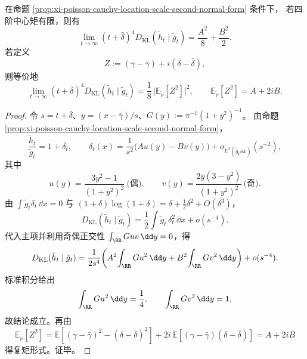 \begin{theorem}[二阶熵系数的锐极限与复二阶矩分解]\label{thm:xi-poisson-cauchy-location-scale-kl-sharp-m2}
在命题 \ref{prop:xi-poisson-cauchy-location-scale-second-normal-form} 条件下，
若四阶中心矩有限，则有
\[
\lim_{t\to\infty}(t+\bar\delta)^4 D_{\mathrm{KL}}(\tilde h_t\mid \tilde g_t)
=\frac{A^2}{8}+\frac{B^2}{2}.
\]
若定义
\[
Z:=(\gamma-\bar\gamma)+i(\delta-\bar\delta),
\]
则等价地
\[
\lim_{t\to\infty}(t+\bar\delta)^4 D_{\mathrm{KL}}(\tilde h_t\mid \tilde g_t)
=\frac18\,\bigl|\mathbb E_{\tilde\nu}[Z^2]\bigr|^2,
\qquad
\mathbb E_{\tilde\nu}[Z^2]=A+2iB.
\]
\end{theorem}

\begin{proof}
令 \(s=t+\bar\delta\)、\(y=(x-\bar\gamma)/s\)、\(G(y):=\pi^{-1}(1+y^2)^{-1}\)。
由命题 \ref{prop:xi-poisson-cauchy-location-scale-second-normal-form}，
\[
\frac{\tilde h_t}{\tilde g_t}=1+\delta_t,\qquad
\delta_t(x)=\frac{1}{s^2}\bigl(Au(y)-Bv(y)\bigr)+o_{L^2(\tilde g_t\dd x)}(s^{-2}),
\]
其中
\[
u(y)=\frac{3y^2-1}{(1+y^2)^2}\ \text{(偶)},\qquad
v(y)=\frac{2y(3-y^2)}{(1+y^2)^2}\ \text{(奇)}.
\]
由 \(\int \tilde g_t\delta_t\,\dd x=0\) 与
\((1+\delta)\log(1+\delta)=\delta+\frac12\delta^2+O(\delta^3)\)，
\[
D_{\mathrm{KL}}(\tilde h_t\mid \tilde g_t)
=\frac12\int \tilde g_t\,\delta_t^2\,\dd x+o(s^{-4}).
\]
代入主项并利用奇偶正交性 \(\int_{\RR}Guv\,\dd y=0\)，得
\[
D_{\mathrm{KL}}(\tilde h_t\mid \tilde g_t)
=\frac{1}{2s^4}\!\left(
A^2\!\int_{\RR}Gu^2\,\dd y+B^2\!\int_{\RR}Gv^2\,\dd y\right)+o(s^{-4}).
\]
标准积分给出
\[
\int_{\RR}Gu^2\,\dd y=\frac14,\qquad
\int_{\RR}Gv^2\,\dd y=1,
\]
故结论成立。再由
\[
\mathbb E_{\tilde\nu}[Z^2]
=\mathbb E\!\left[(\gamma-\bar\gamma)^2-(\delta-\bar\delta)^2\right]
+2i\,\mathbb E\!\left[(\gamma-\bar\gamma)(\delta-\bar\delta)\right]
=A+2iB
\]
得复矩形式。证毕。
\end{proof}

